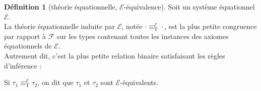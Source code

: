 \documentclass[a4paper]{report}
\theoremstyle{definition}
\newtheorem{definition}[theoreme]{Définition}
\newcommand{\interval}[2]{[\![#1\,;#2]\!]}
\newcommand{\F}{\mathscr{F}}
\newcommand{\E}{\mathscr{E}}
\newcommand{\T}{\mathrm{T}}
\begin{document}
\begin{definition}[théorie équationnelle, $\E$-équivalence]
  Soit un système équationnel $\E$. \\
  La théorie équationnelle induite par $\E$, notée $\cdot \equiv_\T^\E \cdot$, est la plus petite congruence par rapport à $\F$ sur les types contenant toutes les instances des axiomes équationnels de $\E$. \\
  Autrement dit, c'est la plus petite relation binaire satisfaisant les règles d'inférence :
  Si $\tau_1 \equiv_\T^\E \tau_2$, on dit que $\tau_1$ et $\tau_2$ sont $\E$-équivalents.
\end{definition}
\end{document}
